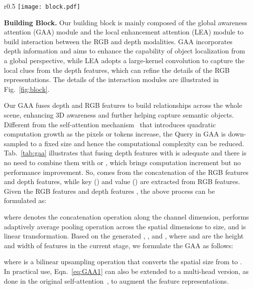 \documentclass{article}
\newcommand{\figref}[1]{Fig.~\ref{#1}}
\newcommand{\tabref}[1]{Tab.~\ref{#1}}
\newcommand{\eqnref}[1]{Eqn.~\ref{#1}}
\newcommand{\myPara}[1]{\vspace{5pt}\noindent\textbf{#1}}
\begin{document}
\begin{wrapfigure}{r}{0.5\textwidth}
  \setlength{\abovecaptionskip}{2pt}
\vspace{-10pt}
  \centering
  \texttt{[image: block.pdf]}
\caption{\small Diagrammatic details on how to conduct interactions between RGB and depth features in our building block. 
}
\label{fig:block}
\end{wrapfigure}

\myPara{Building Block.}
Our building block is mainly composed of the global awareness attention (GAA) module and the local enhancement attention (LEA) module to build interaction between the RGB and depth modalities. 
GAA incorporates depth information and aims to enhance the capability of object localization from a global perspective, while LEA adopts a large-kernel convolution to capture the local clues from the depth features, which can refine the details of the RGB representations.  
The details of the interaction modules are illustrated in \figref{fig:block}.






Our GAA fuses depth and RGB features to build relationships across the whole scene, enhancing 3D awareness and further helping capture semantic objects. 
Different from the self-attention mechanism~\citep{vaswani2017attention} that introduces quadratic computation growth as the pixels or tokens increase, the Query  in GAA is down-sampled to a fixed size and hence the computational complexity can be reduced.  
\tabref{tab:gaa} illustrates that fusing depth features with  is adequate and there is no need to combine them with  or , which brings computation increment but no performance improvement.
So,  comes from the concatenation of the RGB features and depth features, while key () and value () are extracted from RGB features.
Given the RGB features  and depth features , the above process can be formulated as:

where  denotes the concatenation operation along the channel dimension,  performs adaptively average pooling operation across the spatial dimensions to  size, and  is linear transformation.
Based on the generated , , and , where  and  are the height and width of features in the current stage, we formulate the GAA as follows:

where  is a bilinear upsampling operation that converts the spatial size from  to .
In practical use, \eqnref{eq:GAA1} can also be extended to a multi-head
version, as done in the original self-attention~\citep{vaswani2017attention}, 
to augment the feature representations.
\end{document}
